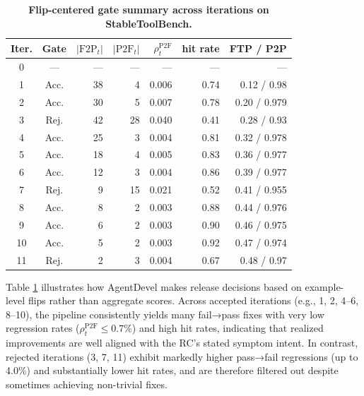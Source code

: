\documentclass[11pt]{article}
\begin{document}
\begin{table}[t]
\centering
\small
\setlength{\tabcolsep}{3pt}
\renewcommand{\arraystretch}{1.12}
\caption{\textbf{Flip-centered gate summary across iterations on StableToolBench.}}
\label{tab:gate-summary}

\begin{tabularx}{\linewidth}{@{}c c r r r r r@{}}
\toprule
Iter. &
Gate &
$\lvert \mathrm{F2P}_t \rvert$ &
$\lvert \mathrm{P2F}_t \rvert$ &
$\rho^{\mathrm{P2F}}_t$ &
hit rate &
\textbf{FTP / P2P} \\
\midrule

0 & --- & --- & --- & --- & --- & --- \\

1 & Acc. & 38 & 4  & 0.006 & 0.74 & 0.12 / 0.98 \\
2 & Acc. & 30 & 5  & 0.007 & 0.78 & 0.20 / 0.979 \\
3 & Rej. & 42 & 28 & 0.040 & 0.41 & 0.28 / 0.93 \\
4 & Acc. & 25 & 3  & 0.004 & 0.81 & 0.32 / 0.978 \\
5 & Acc. & 18 & 4  & 0.005 & 0.83 & 0.36 / 0.977 \\
6 & Acc. & 12 & 3  & 0.004 & 0.86 & 0.39 / 0.977 \\
7 & Rej. & 9  & 15 & 0.021 & 0.52 & 0.41 / 0.955 \\
8 & Acc. & 8  & 2  & 0.003 & 0.88 & 0.44 / 0.976 \\
9 & Acc. & 6  & 2  & 0.003 & 0.90 & 0.46 / 0.975 \\
10 & Acc. & 5 & 2  & 0.003 & 0.92 & 0.47 / 0.974 \\
11 & Rej. & 2 & 3  & 0.004 & 0.67 & 0.48 / 0.97 \\
\bottomrule
\end{tabularx}

\vspace{2pt}


\end{table}



Table \ref{tab:gate-summary} illustrates how AgentDevel makes release decisions based on example-level flips rather than aggregate scores. Across accepted iterations (e.g., 1, 2, 4–6, 8–10), the pipeline consistently yields many fail→pass fixes with very low regression rates ($\rho^{\mathrm{P2F}}_t \le 0.7\%$) and high hit rates, indicating that realized improvements are well aligned with the RC’s stated symptom intent. In contrast, rejected iterations (3, 7, 11) exhibit markedly higher pass→fail regressions (up to 4.0\%) and substantially lower hit rates, and are therefore filtered out despite sometimes achieving non-trivial fixes.
\end{document}
